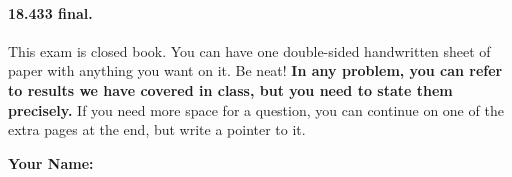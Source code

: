 \documentclass[12pt]{article}
\begin{document}

\paragraph{18.433 final.} This exam is closed book. You can have one double-sided handwritten
sheet of paper with anything you want on it. Be neat!  {\bf In any problem, you can refer to results we have covered in class, but you need to state them precisely. } If you need more space for a question, you can continue on one of the extra pages at the end, but write a pointer to it. 
 \vspace*{0.1in}

\vspace*{0.1in}

{\Large {\bf Your Name:}}
\end{document}
